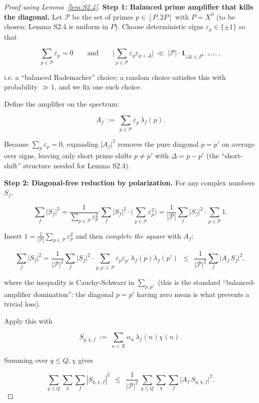\documentclass[11pt]{article}
\theoremstyle{definition}
\theoremstyle{remark}
\begin{document}
\begin{proof}[Proof using Lemma~\ref{lem:S2.4}]

	\noindent\textbf{Step 1: Balanced prime amplifier that kills the diagonal.}
	Let $\mathcal P$ be the set of primes $p\in[P,2P]$ with $P=X^\vartheta$ (to be chosen; Lemma S2.4 is uniform in $P$).
	Choose deterministic signs $\varepsilon_p\in\{\pm 1\}$ so that

	$$
		\sum_{p\in\mathcal P}\varepsilon_p=0
		\qquad\text{and}\qquad
		\Big|\sum_{p\in\mathcal P}\varepsilon_p\varepsilon_{p+\Delta}\Big|\ \ll\ |\mathcal P|\cdot \mathbf{1}_{|\Delta|\le P^{1-o(1)}},
	$$

	i.e. a “balanced Rademacher” choice; a random choice satisfies this with probability $\gg 1$, and we fix one such choice.

	Define the amplifier on the spectrum:

	$$
		A_f \ :=\ \sum_{p\in\mathcal P}\varepsilon_p\,\lambda_f(p).
	$$

	Because $\sum_p\varepsilon_p=0$, expanding $|A_f|^2$ removes the pure diagonal $p=p'$ on average over signs, leaving only short prime shifts $p\neq p'$ with $\Delta = p-p'$ (the “short-shift” structure needed for Lemma S2.4).

	\noindent\textbf{Step 2: Diagonal-free reduction by polarization.}
	For any complex numbers $S_f$,

	$$
		\sum_f |S_f|^2
		=\frac{1}{\sum_{p\in\mathcal P}\varepsilon_p^2}\,
		\sum_f |S_f|^2\cdot \Big(\sum_{p\in\mathcal P}\varepsilon_p^2\Big)
		=\frac{1}{|\mathcal P|}\sum_f |S_f|^2\cdot \sum_{p\in\mathcal P}1.
	$$

	Insert $1=\frac{1}{|\mathcal P|}\sum_{p\in\mathcal P}\varepsilon_p^2$ and then \emph{complete the square} with $A_f$:

	$$
		\sum_f |S_f|^2
		=\frac{1}{|\mathcal P|^2}\sum_f |S_f|^2\cdot \sum_{p,p'\in\mathcal P}\varepsilon_p\varepsilon_{p'}\,\lambda_f(p)\lambda_f(p')
		\ \ \le\ \ \frac{1}{|\mathcal P|^2}\sum_f |A_f\,S_f|^2,
	$$

	where the inequality is Cauchy-Schwarz in $\sum_{p,p'}$ (this is the standard “balanced-amplifier domination”: the diagonal $p=p'$ having zero mean is what prevents a trivial loss).

	Apply this with

	$$
		S_{q,\chi,f}\ :=\ \sum_{n\asymp X}\alpha_n\,\lambda_f(n)\chi(n).
	$$

	Summing over $q\le Q,\chi$ gives

	\begin{equation}
		\sum_{q\le Q}\sum_{\chi}\sum_f |S_{q,\chi,f}|^2
		\ \ \le\ \ \frac{1}{|\mathcal P|^2}\,
		\sum_{q\le Q}\sum_{\chi}\sum_f \big|A_f\,S_{q,\chi,f}\big|^2.
		\tag{3.1}
	\end{equation}


\end{proof}
\end{document}
